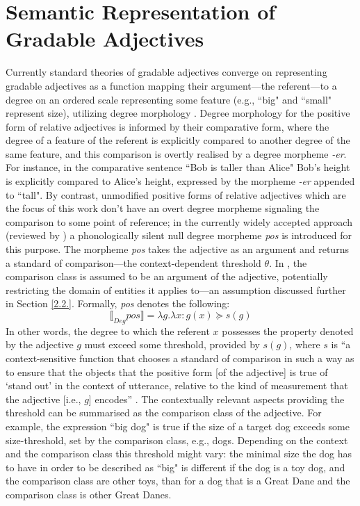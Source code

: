 \section{Semantic Representation of Gradable Adjectives}
\label{2.1.}
Currently standard theories of gradable adjectives converge on representing gradable adjectives as a function mapping their argument---the referent---to a degree on an ordered scale representing some feature (e.g., ``big" and ``small" represent size),  utilizing degree morphology \parencite{Kennedy2007, sedivy1999, Aparicio2016}. Degree morphology for the positive form of relative adjectives is informed by their comparative form, where the degree of a feature of the referent is explicitly compared to another degree of the same feature, and this comparison is overtly realised by a degree morpheme \textit{-er}. For instance, in the comparative sentence ``Bob is taller than Alice" Bob’s height is explicitly compared to Alice’s height, expressed by the morpheme \textit{-er} appended to ``tall". 
By contrast, unmodified positive forms of relative adjectives which are the focus of this work don’t have an overt degree morpheme signaling the comparison to some point of reference; in the currently widely accepted approach (reviewed by \cite{Kennedy2007}) a phonologically silent null degree morpheme \textit{pos} is introduced for this purpose. 
The morpheme \textit{pos} takes the adjective as an argument and returns a standard of comparison---the context-dependent threshold $\theta$. In \textcite{Kennedy2007}, the comparison class is assumed to be an argument of the adjective, potentially restricting the domain of entities it applies to---an assumption discussed further in Section \ref{2.2.}. Formally, \textit{pos} denotes the following:
\begin{equation}
\llbracket_{Deg} pos  \rrbracket = \lambda g. \lambda x: g(x) \succeq s(g)
\end{equation}
In other words, the degree to which the referent $x$ possesses the property denoted by the adjective $g$ must exceed some threshold, provided by $s(g)$, where $s$ is “a context-sensitive function that chooses a standard of comparison in such a way as to ensure that the objects that the positive form [of the adjective] is true of ‘stand out’ in the context of utterance, relative to the kind of measurement that the adjective [i.e., $g$] encodes” \parencite[p. 17]{Kennedy2007}. The contextually relevant aspects providing the threshold can be summarised as the comparison class of the adjective. 
For example, the expression ``big dog" is true if the size of a target dog exceeds some size-threshold, set by the comparison class, e.g., dogs. Depending on the context and the comparison class this threshold might vary: the minimal size the dog has to have in order to be described as ``big" is different if the dog is a toy dog, and the comparison class are other toys, than for a dog that is a Great Dane and the comparison class is other Great Danes.

